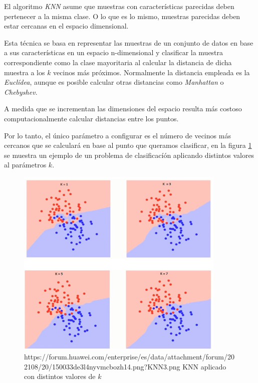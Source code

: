             El algoritmo \textit{KNN} asume que muestras con características parecidas deben pertenecer a la misma clase. O lo que es lo mismo, muestras parecidas deben estar cercanas en el espacio dimensional.

            Esta técnica se basa en representar las muestras de un conjunto de datos en base a sus características en un espacio n-dimensional y clasificar la muestra correspondiente como la clase mayoritaria al calcular la distancia de dicha muestra a los $k$ vecinos más próximos. Normalmente la distancia empleada es la \textit{Euclídea}, aunque es posible calcular otras distancias como \textit{Manhattan} o \textit{Chebyshev}.
            
            A medida que se incrementan las dimensiones del espacio resulta más costoso computacionalmente calcular distancias entre los puntos.


            Por lo tanto, el único parámetro a configurar es el número de vecinos más cercanos que se calculará en base al punto que queramos clasificar, en la figura \ref{KNNImage} se muestra un ejemplo de un problema de clasificacíón aplicando distintos valores al parámetros $k$.

            \begin{figure}[h]
                \centering
                \includegraphics[width=10cm]{archivos/CNN/KNN/KNNImage}
                \caption{https://forum.huawei.com/enterprise/es/data/attachment/forum/202108/20/150033de3l4nyvmcbozh14.png?KNN3.png KNN aplicado con distintos valores de $k$}
                \label{KNNImage}
            \end{figure}

            

